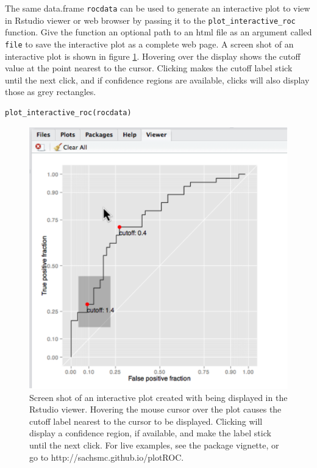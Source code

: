 \documentclass[article]{jss}
\begin{document}
The same data.frame \texttt{rocdata} can be used to generate an
interactive plot to view in Rstudio viewer or web browser by passing it
to the \texttt{plot\_interactive\_roc} function. Give the function an
optional path to an html file as an argument called \texttt{file} to
save the interactive plot as a complete web page. A screen shot of an
interactive plot is shown in figure \ref{interact}. Hovering over the
display shows the cutoff value at the point nearest to the cursor.
Clicking makes the cutoff label stick until the next click, and if
confidence regions are available, clicks will also display those as grey
rectangles.

\begin{verbatim}
plot_interactive_roc(rocdata)
\end{verbatim}

\begin{figure}[ht]
\centering
\includegraphics{figure/screen-shot.pdf}
\caption{Screen shot of an interactive plot created with  being displayed in the Rstudio viewer. Hovering the mouse cursor over the plot causes the cutoff label nearest to the cursor to be displayed. Clicking will display a confidence region, if available, and make the label stick until the next click. For live examples, see the package vignette, or go to http://sachsmc.github.io/plotROC. \label{interact}}
\end{figure}
\end{document}
